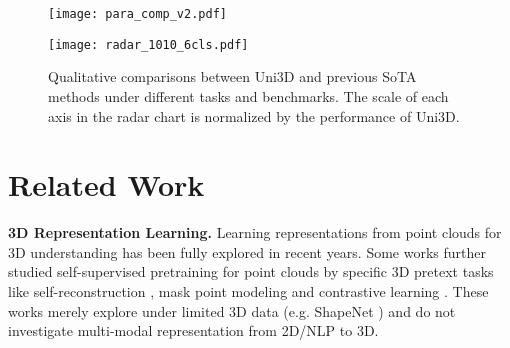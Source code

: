 \documentclass{article} \usepackage{iclr2024_conference,times}
\def\Ours{Uni3D\xspace}
\begin{document}
\begin{figure}[tb]
\begin{minipage}{0.53\textwidth}
  \centering
  \texttt{[image: para\_comp\_v2.pdf]}
  \vspace{-0.7cm}
  \caption{The parameter and zero-shot accuracy comparison. Uni3D scales up 3D representation from 6M to 1B. `PB' indicates PointBERT. `ULIP-PB*' indicates retrained ULIP on the ensambled large dataset.}
  \label{fig:scaling}
\end{minipage}\hspace{0.2cm}
\begin{minipage}{0.44\textwidth}
  \centering
  \texttt{[image: radar\_1010\_6cls.pdf]}
  \vspace{-0.6cm}
  \caption{Qualitative comparisons between \Ours and previous SoTA methods under different tasks and benchmarks. The scale of each axis in the radar chart is normalized by the performance of \Ours .}
  \label{fig:radar}
\end{minipage}
\vspace{-0.45cm}
\end{figure}






































 







\section{Related Work}

\textbf{3D Representation Learning.}
Learning representations from point clouds for 3D understanding \citep{qi2017pointnet, qi2017pointnet++, wang2019dynamic, yu2021pointr} has been fully explored in recent years. Some works further studied self-supervised pretraining for point clouds by specific 3D pretext tasks like self-reconstruction \citep{wang2021unsupervised}, mask point modeling \citep{yu2022point} and contrastive learning \citep{qi2023contrast}. These works merely explore under limited 3D data (e.g. ShapeNet \citep{chang2015shapenet}) and do not investigate multi-modal representation from 2D/NLP to 3D.
\end{document}

